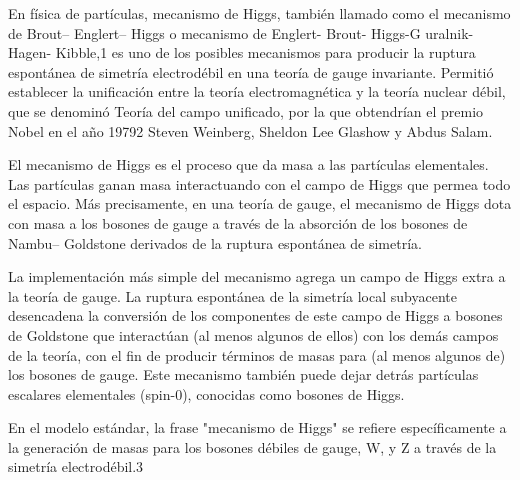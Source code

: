 \documentclass[a4paper,12pt,twoside]{book}
\begin{document}
En física de partículas, mecanismo de Higgs, también llamado como el mecanismo de Brout– Englert– Higgs o mecanismo de Englert- Brout- Higgs-G uralnik- Hagen- Kibble,1 es uno de los posibles mecanismos para producir la ruptura espontánea de simetría electrodébil en una teoría de gauge invariante. Permitió establecer la unificación entre la teoría electromagnética y la teoría nuclear débil, que se denominó Teoría del campo unificado, por la que obtendrían el premio Nobel en el año 19792 Steven Weinberg, Sheldon Lee Glashow y Abdus Salam.

El mecanismo de Higgs es el proceso que da masa a las partículas elementales. Las partículas ganan masa interactuando con el campo de Higgs que permea todo el espacio. Más precisamente, en una teoría de gauge, el mecanismo de Higgs dota con masa a los bosones de gauge a través de la absorción de los bosones de Nambu– Goldstone derivados de la ruptura espontánea de simetría.

La implementación más simple del mecanismo agrega un campo de Higgs extra a la teoría de gauge. La ruptura espontánea de la simetría local subyacente desencadena la conversión de los componentes de este campo de Higgs a bosones de Goldstone que interactúan (al menos algunos de ellos) con los demás campos de la teoría, con el fin de producir términos de masas para (al menos algunos de) los bosones de gauge. Este mecanismo también puede dejar detrás partículas escalares elementales (spin-0), conocidas como bosones de Higgs.

En el modelo estándar, la frase "mecanismo de Higgs" se refiere específicamente a la generación de masas para los bosones débiles de gauge, W, y Z a través de la simetría electrodébil.3
\end{document}
